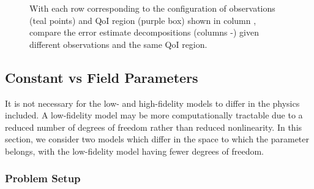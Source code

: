 \begin{figure}[htbp]
\centering
{} 
  \caption{With each row corresponding to the configuration of observations (teal points) and QoI region (purple box) shown in column \protect{}, compare the error estimate decompositions (columns \protect{}-\protect{}) given different observations and the same QoI region.}
  \label{fig:dataStudy}
\end{figure}

\subsection{Constant vs Field Parameters} \label{sec:constvfield}

It is not necessary for the low- and high-fidelity models to differ in the physics included. A low-fidelity model may be more computationally tractable due to a reduced number of degrees of freedom rather than reduced nonlinearity. In this section, we consider two models which differ in the space to which the parameter belongs, with the low-fidelity model having fewer degrees of freedom.

\subsubsection{Problem Setup}

